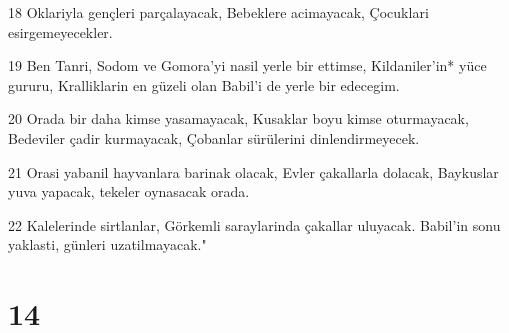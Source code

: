 \par 18 Oklariyla gençleri parçalayacak, Bebeklere acimayacak, Çocuklari esirgemeyecekler.
\par 19 Ben Tanri, Sodom ve Gomora'yi nasil yerle bir ettimse, Kildaniler'in* yüce gururu, Kralliklarin en güzeli olan Babil'i de yerle bir edecegim.
\par 20 Orada bir daha kimse yasamayacak, Kusaklar boyu kimse oturmayacak, Bedeviler çadir kurmayacak, Çobanlar sürülerini dinlendirmeyecek.
\par 21 Orasi yabanil hayvanlara barinak olacak, Evler çakallarla dolacak, Baykuslar yuva yapacak, tekeler oynasacak orada.
\par 22 Kalelerinde sirtlanlar, Görkemli saraylarinda çakallar uluyacak. Babil'in sonu yaklasti, günleri uzatilmayacak."

\chapter{14}

